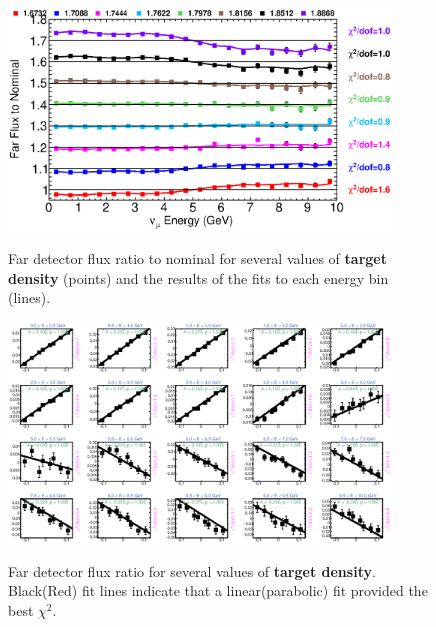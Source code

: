 \begin{figure}[ht]
  \begin{center}
    {\includegraphics[width=4.0in]{figures/Density__far_summary.eps}}
  \end{center}
\caption{ Far detector flux ratio to nominal for several values of {\bf target density} (points) and the results of the fits to each energy bin (lines).}
\end{figure}

\begin{figure}[hb]
  \begin{center}
    {\includegraphics[width=4.0in]{figures/Density__far_fits.eps}}
  \end{center}
\caption{ Far detector flux ratio for several values of {\bf target density}. Black(Red) fit lines indicate that a linear(parabolic) fit provided the best $\chi^2$. }
\end{figure}

